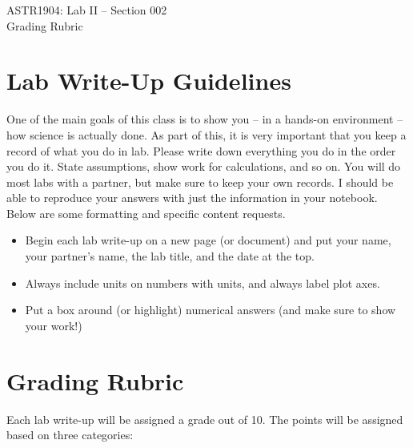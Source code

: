 \documentclass[10pt]{article}
\begin{document}
\begin{center}
\LARGE{ASTR1904: Lab II -- Section 002} \\ \medskip \Large{Grading Rubric}\\ 
\end{center}

\section*{Lab Write-Up Guidelines}

One of the main goals of this class is to show you -- in a hands-on environment -- how science is actually done. As part of this, it is very important that you keep a record of what you do in lab. Please write down everything you do in the order you do it. State assumptions, show work for calculations, and so on. You will do most labs with a partner, but make sure to keep your own records. I should be able to reproduce your answers with just the information in your notebook. Below are some formatting and specific content requests.

\begin{itemize}
\item Begin each lab write-up on a new page (or document) and put your name, your partner's name, the lab title, and the date at the top.
\item Always include units on numbers with units, and always label plot axes.
\item Put a box around (or highlight) numerical answers (and make sure to show your work!)
\end{itemize}

\section*{Grading Rubric}

Each lab write-up will be assigned a grade out of 10. The points will be assigned based on three categories:
\end{document}
